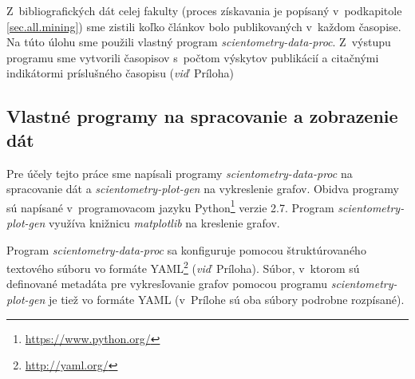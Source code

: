 Z~bibliografických dát celej fakulty (proces získavania je popísaný
v~podkapitole \ref{sec.all.mining}) sme zistili koľko článkov bolo publikovaných
v~každom časopise.  Na túto úlohu sme použili vlastný program
\emph{scientometry-data-proc}.  Z~výstupu programu sme vytvorili časopisov
s~počtom výskytov publikácií a citačnými indikátormi príslušného časopisu
(\emph{viď}~Príloha)

\subsection{Vlastné programy na spracovanie a zobrazenie dát}
\label{sec:program.my}

Pre účely tejto práce sme napísali programy \emph{scientometry-data-proc} na
spracovanie dát a \emph{scientometry-plot-gen} na vykreslenie grafov.  Obidva
programy sú napísané v~programovacom jazyku
Python\footnote{\url{https://www.python.org/}} verzie 2.7.  Program
\emph{scientometry-plot-gen} využíva knižnicu \emph{matplotlib} na kreslenie
grafov.

Program \emph{scientometry-data-proc} sa konfiguruje pomocou štruktúrovaného
textového súboru vo formáte YAML\footnote{\url{http://yaml.org/}}
(\emph{viď}~Príloha).  Súbor, v~ktorom sú definované metadáta pre vykresľovanie
grafov pomocou programu \emph{scientometry-plot-gen} je tiež vo formáte YAML
(v~Prílohe sú oba súbory podrobne rozpísané).


